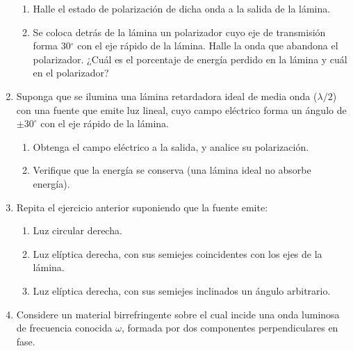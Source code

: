 \documentclass[11pt,spanish]{article}
\begin{document}
\begin{enumerate}
    \begin{enumerate}
        \item Halle el estado de polarización de dicha onda a la salida de la
        lámina.

        \item Se coloca detrás de la lámina un polarizador cuyo eje de
        transmisión forma 30$^{\circ}$ con el eje rápido de la lámina. Halle la
        onda que abandona el polarizador. ¿Cuál es el porcentaje de energía
        perdido en la lámina y cuál en el polarizador?
    \end{enumerate}


    \item Suponga que se ilumina una lámina retardadora ideal de media onda
    ($\lambda/2$) con una fuente que emite luz lineal, cuyo campo eléctrico
    forma un ángulo de $\pm30^{\circ}$ con el eje rápido de la lámina.
    
    \begin{enumerate}
        \item Obtenga el campo eléctrico a la salida, y analice su polarización.

        \item Verifique que la energía se conserva (una lámina ideal no absorbe
        energía). 
    \end{enumerate}


    \item Repita el ejercicio anterior suponiendo que la fuente emite:
    
    \begin{enumerate}
        \item Luz circular derecha.
        
        \item Luz elíptica derecha, con sus semiejes coincidentes con los ejes
        de la lámina.
        
        \item Luz elíptica derecha, con sus semiejes inclinados un ángulo
        arbitrario.
        
    \end{enumerate}


    \item Considere un material birrefringente sobre el cual incide una onda
    luminosa de frecuencia conocida $\omega$, formada por dos componentes
    perpendiculares en fase.
    

\end{enumerate}
\end{document}
